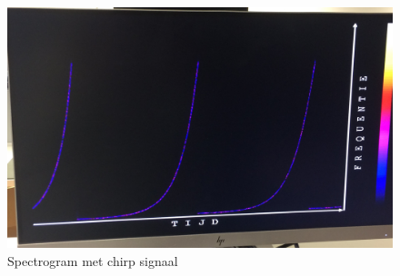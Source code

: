 \documentclass[a4paper,kul]{kulakarticle} %
\begin{document}
\begin{figure}[H]
	\centering
	\includegraphics[width=0.7\linewidth]{Spectrogram_chirp.jpg}
	\caption{Spectrogram met chirp signaal}
	\label{fig:spectrogram_chirp}
\end{figure}
\end{document}
